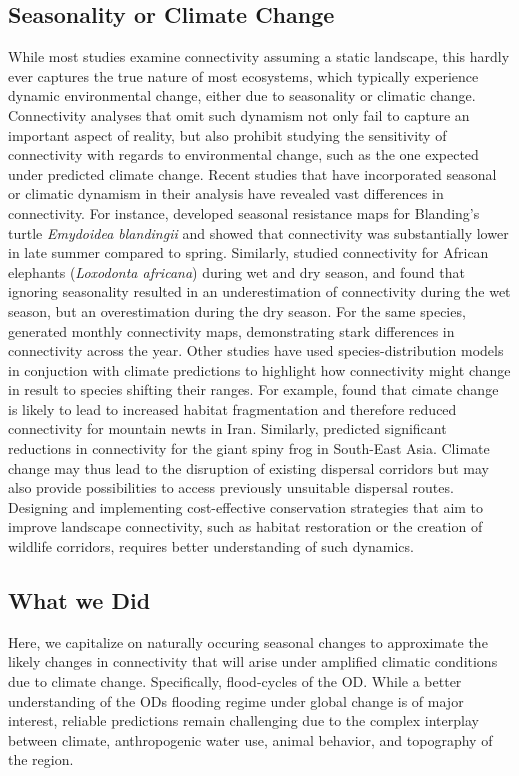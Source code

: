 \documentclass[abstract=on,10pt,a4paper,bibliography=totocnumbered]{article}
\begin{document}
\subsection{Seasonality or Climate Change}
While most studies examine connectivity assuming a static landscape, this hardly
ever captures the true nature of most ecosystems, which typically experience
dynamic environmental change, either due to seasonality or climatic change.
Connectivity analyses that omit such dynamism not only fail to capture an
important aspect of reality, but also prohibit studying the sensitivity of
connectivity with regards to environmental change, such as the one expected
under predicted climate change. Recent studies that have incorporated seasonal
or climatic dynamism in their analysis have revealed vast differences in
connectivity. For instance, \cite{Mui.2017} developed seasonal resistance maps
for Blanding's turtle \textit{Emydoidea blandingii} and showed that connectivity
was substantially lower in late summer compared to spring. Similarly,
\cite{Osipova.2019} studied connectivity for African elephants
(\textit{Loxodonta africana}) during wet and dry season, and found that ignoring
seasonality resulted in an underestimation of connectivity during the wet
season, but an overestimation during the dry season. For the same species,
\citep{Kaszta.2021} generated monthly connectivity maps, demonstrating stark
differences in connectivity across the year. Other studies have used
species-distribution models in conjuction with climate predictions to highlight
how connectivity might change in result to species shifting their ranges. For
example, \cite{Ashrafzadeh.2019} found that cimate change is likely to lead to
increased habitat fragmentation and therefore reduced connectivity for mountain
newts in Iran. Similarly, \cite{Luo.2021} predicted significant reductions in
connectivity for the giant spiny frog in South-East Asia. Climate change may
thus lead to the disruption of existing dispersal corridors but may also provide
possibilities to access previously unsuitable dispersal routes. Designing and
implementing cost-effective conservation strategies that aim to improve
landscape connectivity, such as habitat restoration or the creation of wildlife
corridors, requires better understanding of such dynamics.

\subsection{What we Did}
Here, we capitalize on naturally occuring seasonal changes to approximate the
likely changes in connectivity that will arise under amplified climatic
conditions due to climate change. Specifically, flood-cycles of the OD. While a
better understanding of the ODs flooding regime under global change is of major
interest, reliable predictions remain challenging due to the complex interplay
between climate, anthropogenic water use, animal behavior, and topography of the
region.
\end{document}
